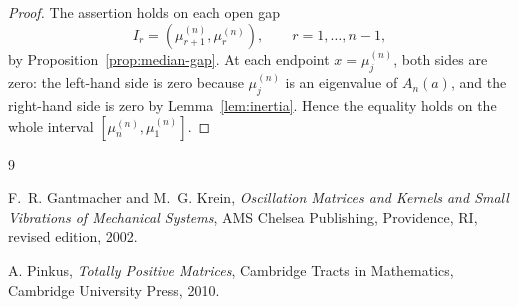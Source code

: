 \documentclass[11pt]{article}
\begin{document}
\begin{proof}
The assertion holds on each open gap
\[
I_r=(\mu_{r+1}^{(n)},\mu_r^{(n)}),
\qquad r=1,\ldots,n-1,
\]
by Proposition~\ref{prop:median-gap}.  At each endpoint $x=\mu_j^{(n)}$, both
sides are zero: the left-hand side is zero because $\mu_j^{(n)}$ is an
eigenvalue of $A_n(a)$, and the right-hand side is zero by
Lemma~\ref{lem:inertia}.  Hence the equality holds on the whole interval
$[\mu_n^{(n)},\mu_1^{(n)}]$.
\end{proof}

\begin{thebibliography}{9}

F.~R. Gantmacher and M.~G. Krein,
\emph{Oscillation Matrices and Kernels and Small Vibrations of Mechanical Systems},
AMS Chelsea Publishing, Providence, RI, revised edition, 2002.

A. Pinkus,
\emph{Totally Positive Matrices},
Cambridge Tracts in Mathematics, Cambridge University Press, 2010.

\end{thebibliography}
\end{document}
